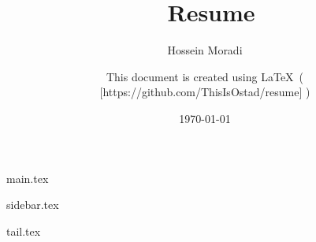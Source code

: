 \documentclass[10pt,a4paper]{resume}
\author{Hossein Moradi}
\date{\today}
\title{\@author\ Resume}
\begin{document}

  \begin{paracol}{2}

    \begin{leftcolumn}
      \makecvheader\bigskip
    \end{leftcolumn}
    \begin{rightcolumn}
    \end{rightcolumn}

    \begin{leftcolumn*}
      {main.tex}
    \end{leftcolumn*}

    \begin{rightcolumn}
      {sidebar.tex}
      \signature{%
        This document is created using \LaTeX \ (%
          [https://github.com/ThisIsOstad/resume]%
        )%
      }
    \end{rightcolumn}

  \end{paracol}

  \newpage
  {tail.tex}
\end{document}
